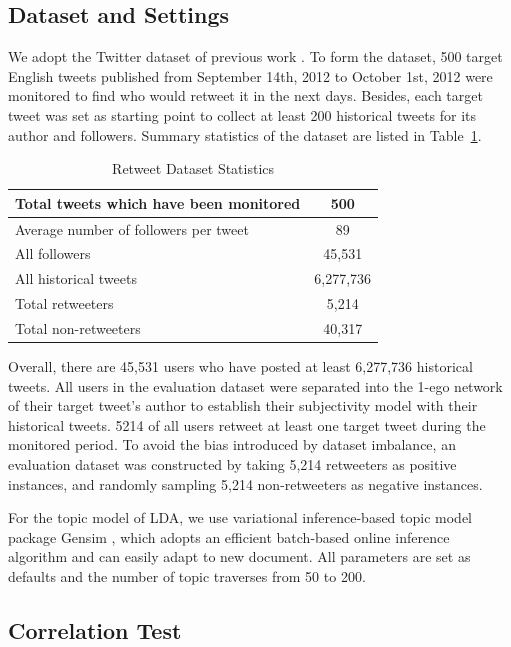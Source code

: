 \documentclass{acm_proc_article-sp}
\begin{document}
\subsection{Dataset and Settings}
We adopt the Twitter dataset of previous work \cite{Luo:2013RMF}. 
To form the dataset, 500 target English tweets published from September 14th, 2012 to October 1st, 2012 were monitored to find who would retweet it in the next days. 
Besides, each target tweet was set as starting point to collect at least 200 historical tweets for its author and followers.
Summary statistics of the dataset are listed in Table~\ref{datasetstat}.
\begin{table}[htb]
\centering
\caption{Retweet Dataset Statistics}
\label{datasetstat}
\begin{tabular}{|l|c|}
\hline
Total tweets which have been monitored & 500 \\
\hline
Average number of followers per tweet & 89 \\
\hline
All followers & 45,531 \\
\hline
All historical tweets & 6,277,736 \\
\hline
Total retweeters & 5,214 \\
\hline
Total non-retweeters & 40,317  \\
\hline
\end{tabular}
\end{table}
Overall, there are 45,531 users who have posted at least 6,277,736 historical tweets. All users in the evaluation dataset were separated into the 1-ego network of their target tweet's author to establish their subjectivity model with their historical tweets. 5214 of all users retweet at least one target tweet during the monitored period. To avoid the bias introduced by dataset imbalance, an evaluation dataset was constructed by taking 5,214 retweeters as positive instances, and randomly sampling 5,214 non-retweeters as negative instances.  

For the topic model of LDA, we use variational inference-based topic model package Gensim \cite{rehurek_lrec}, which adopts an efficient batch-based online inference algorithm and can easily adapt to new document. All parameters are set as defaults and the number of topic traverses from 50 to 200.
\subsection{Correlation Test}
\end{document}

